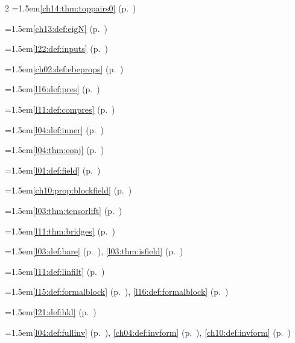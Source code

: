 \begin{multicols}{2}
\hangindent=1.5em\quad \ref{ch14:thm:toppairs0} (p.~\pageref{ch14:thm:toppairs0})\par
\hangindent=1.5em\quad \ref{ch13:def:eigN} (p.~\pageref{ch13:def:eigN})\par
\hangindent=1.5em\quad \ref{l22:def:inputs} (p.~\pageref{l22:def:inputs})\par
\hangindent=1.5em\quad \ref{ch02:def:ebeprops} (p.~\pageref{ch02:def:ebeprops})\par
\hangindent=1.5em\quad \ref{l16:def:pres} (p.~\pageref{l16:def:pres})\par
\hangindent=1.5em\quad \ref{l11:def:compres} (p.~\pageref{l11:def:compres})\par
\hangindent=1.5em\quad \ref{l04:def:inner} (p.~\pageref{l04:def:inner})\par
\hangindent=1.5em\quad \ref{l04:thm:conj} (p.~\pageref{l04:thm:conj})\par
\hangindent=1.5em\quad \ref{l01:def:field} (p.~\pageref{l01:def:field})\par
\hangindent=1.5em\quad \ref{ch10:prop:blockfield} (p.~\pageref{ch10:prop:blockfield})\par
\hangindent=1.5em\quad \ref{l03:thm:tensorlift} (p.~\pageref{l03:thm:tensorlift})\par
\hangindent=1.5em\quad \ref{l11:thm:bridges} (p.~\pageref{l11:thm:bridges})\par
\hangindent=1.5em\quad \ref{l03:def:bare} (p.~\pageref{l03:def:bare}), \ref{l03:thm:isfield} (p.~\pageref{l03:thm:isfield})\par
\hangindent=1.5em\quad \ref{l11:def:linfilt} (p.~\pageref{l11:def:linfilt})\par
\hangindent=1.5em\quad \ref{l15:def:formalblock} (p.~\pageref{l15:def:formalblock}), \ref{l16:def:formalblock} (p.~\pageref{l16:def:formalblock})\par
\hangindent=1.5em\quad \ref{l21:def:hkl} (p.~\pageref{l21:def:hkl})\par
\hangindent=1.5em\quad \ref{l04:def:fullinv} (p.~\pageref{l04:def:fullinv}), \ref{ch04:def:invform} (p.~\pageref{ch04:def:invform}), \ref{ch10:def:invform} (p.~\pageref{ch10:def:invform})\par

\end{multicols}
